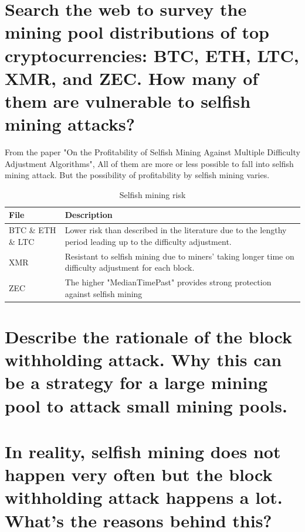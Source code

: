 \documentclass{article}
\begin{document}
\section{Search the web to survey the mining pool distributions of top cryptocurrencies:
BTC, ETH, LTC, XMR, and ZEC. How many of them are vulnerable to selfish mining
attacks?}
From the paper "On the Profitability of Selfish Mining Against
Multiple Difficulty Adjustment Algorithms",
All of them are more or less possible to fall into selfish mining attack.
But the possibility of profitability by selfish mining varies.
\begin{table}[h]
    \small
    \begin{threeparttable}
        \begin{tabular}{|p{4cm}|p{10cm}|}
        \hline
        \textbf{File} &	\textbf{Description} \\
        \hline
        BTC \& ETH \& LTC & Lower risk than described in 
        the literature due to  the lengthy period leading up to the difficulty
        adjustment.\\
        \hline
        XMR & Resistant to selfish mining due to miners' taking longer time 
        on difficulty adjustment
        for each block.\\
        \hline
        ZEC & The higher "MedianTimePast" provides 
        strong protection against selfish mining\\
        \hline
        \end{tabular}
    \end{threeparttable}
    \caption{Selfish mining risk}
    \label{table:smr}
\end{table}
\section{Describe the rationale of the block withholding attack. Why this can be a strategy
for a large mining pool to attack small mining pools.}
\section{In reality, selfish mining does not happen very often but the block withholding
attack happens a lot. What’s the reasons behind this?}
\end{document}
